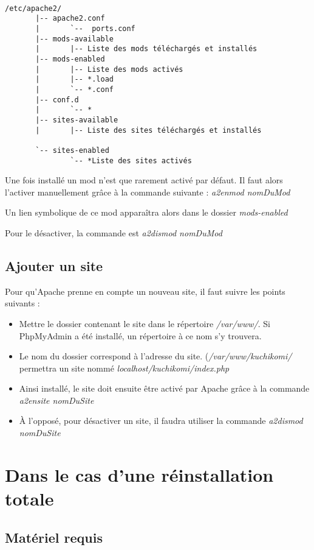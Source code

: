 \documentclass[a4paper,12pt,titlepage]{article}
\begin{document}
\begin{verbatim}

/etc/apache2/
       |-- apache2.conf
       |       `--  ports.conf
       |-- mods-available
       |       |-- Liste des mods téléchargés et installés
       |-- mods-enabled
       |       |-- Liste des mods activés
       |       |-- *.load
       |       `-- *.conf
       |-- conf.d
       |       `-- *
       |-- sites-available
       |       |-- Liste des sites téléchargés et installés

       `-- sites-enabled
               `-- *Liste des sites activés

\end{verbatim}

Une fois installé un mod n'est que rarement activé par défaut. Il faut alors l'activer manuellement grâce à la commande suivante :
\emph{a2enmod nomDuMod}

Un lien symbolique de ce mod apparaîtra alors dans le dossier \emph{mods-enabled}

Pour le désactiver, la commande est
\emph{a2dismod nomDuMod}

\subsection{Ajouter un site}

Pour qu'Apache prenne en compte un nouveau site, il faut suivre les points suivants :
\begin{itemize}
\item Mettre le dossier contenant le site dans le répertoire \emph{/var/www/}. Si PhpMyAdmin a été installé, un répertoire à ce nom s'y trouvera.
\item Le nom du dossier correspond à l'adresse du site. (\emph{/var/www/kuchikomi/} permettra un site nommé \emph{localhost/kuchikomi/index.php}
\item Ainsi installé, le site doit ensuite être activé par Apache grâce à la commande \emph{a2ensite nomDuSite}
\item À l'opposé, pour désactiver un site, il faudra utiliser la commande \emph{a2dismod nomDuSite}
\end{itemize}


\section{Dans le cas d'une réinstallation totale}

\subsection{Matériel requis}
\end{document}
